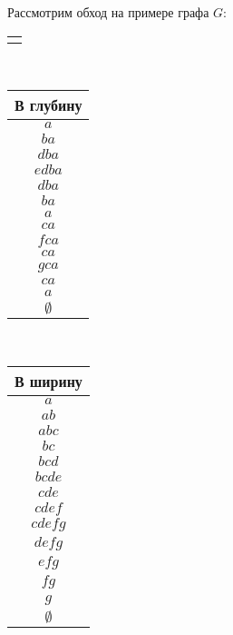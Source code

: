 \documentclass[russian]{lecture-notes}
\newenvironment{tabulargraph}[3]
{
	\begin{tabular}{c}
		\begin{tikzpicture}[every node/.style={#1}, every edge/.style={#2}, every path/.style={#3}]
	}
	{
		\end{tikzpicture}
	\end{tabular}
	~~~
}
\begin{document}
	\begin{example}
		Рассмотрим обход на примере графа $G$:
		\begin{center}
			\begin{tabulargraph}{circle, draw=black, thick, scale=0.8}{draw=black, thick}{}
				\node (a) at (0,0){a};
				\node (b) at (-1,-1){b};
				\node (c) at (1,-1){c};
				\node (d) at (-2,-2.25){d};
				\node (e) at (-0.66,-2.25){e};
				\node (f) at (2,-2.25){f};
				\node (g) at (0.66,-2.25){g};
				
				\path (a) edge (b);
				\path (a) edge (c);
				\path (b) edge (d);
				\path (b) edge (e);
				\path (e) edge (d);
				\path (c) edge (f);
				\path (c) edge (g);
			\end{tabulargraph}
			~~~
			\begin{tabular}{c}
				В глубину\\
				\hline
				$a$\\
				$ba$\\
				$dba$\\
				$edba$\\
				$dba$\\
				$ba$\\
				$a$\\
				$ca$\\
				$fca$\\
				$ca$\\
				$gca$\\
				$ca$\\
				$a$\\
				$\emptyset$
			\end{tabular}
			~~~
			\begin{tabular}{c}
				В ширину\\
				\hline
				$a$\\
				$ab$\\
				$abc$\\
				$bc$\\
				$bcd$\\
				$bcde$\\
				$cde$\\
				$cdef$\\
				$cdefg$\\
				$defg$\\
				$efg$\\
				$fg$\\
				$g$\\
				$\emptyset$
			\end{tabular}
		\end{center}
	\end{example}
\end{document}
